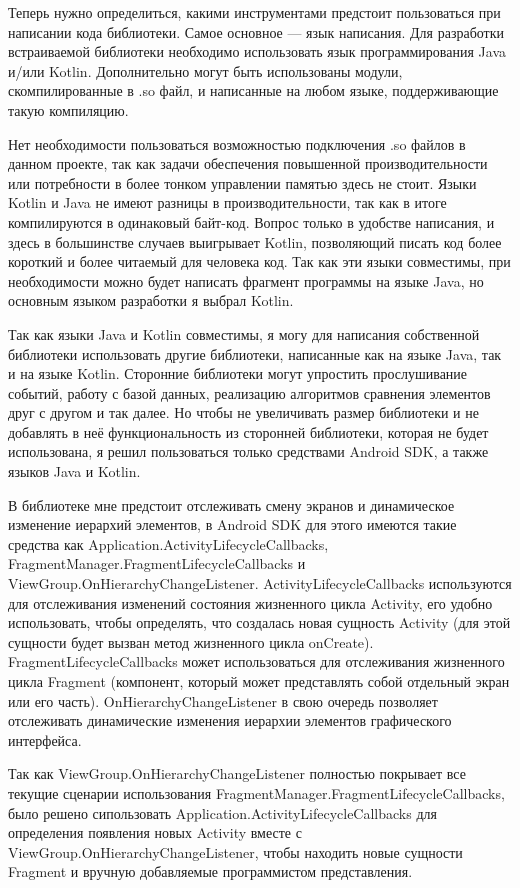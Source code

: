 \documentclass[a4paper,14pt]{extarticle} %
\begin{document}
	Теперь нужно определиться, какими инструментами предстоит пользоваться при написании кода библиотеки. Самое основное — язык написания. Для разработки встраиваемой библиотеки необходимо использовать язык программирования Java и/или Kotlin. Дополнительно могут быть использованы модули, скомпилированные в .so файл, и написанные на любом языке, поддерживающие такую компиляцию. 
	
	Нет необходимости пользоваться возможностью подключения .so файлов в данном проекте, так как задачи обеспечения повышенной производительности или потребности в более тонком управлении памятью здесь не стоит. Языки Kotlin и Java не имеют разницы в производительности, так как в итоге компилируются в одинаковый байт-код. Вопрос только в удобстве написания, и здесь в большинстве случаев выигрывает Kotlin, позволяющий писать код более короткий и более читаемый для человека код. Так как эти языки совместимы, при необходимости можно будет написать фрагмент программы на языке Java, но основным языком разработки я выбрал Kotlin.
	
	Так как языки Java и Kotlin совместимы, я могу для написания собственной библиотеки использовать другие библиотеки, написанные как на языке Java, так и на языке Kotlin. Сторонние библиотеки могут упростить прослушивание событий, работу с базой данных, реализацию алгоритмов сравнения элементов друг с другом и так далее. Но чтобы не увеличивать размер библиотеки и не добавлять в неё функциональность из сторонней библиотеки, которая не будет использована, я решил пользоваться только средствами Android SDK, а также языков Java и Kotlin.
	
	В библиотеке мне предстоит отслеживать смену экранов и динамическое изменение иерархий элементов, в Android SDK для этого имеются такие средства как Application.ActivityLifecycleCallbacks, FragmentManager.FragmentLifecycleCallbacks и ViewGroup.OnHierarchyChangeListener. ActivityLifecycleCallbacks используются для отслеживания изменений состояния жизненного цикла Activity, его удобно использовать, чтобы определять, что создалась новая сущность Activity (для этой сущности будет вызван метод жизненного цикла onCreate). FragmentLifecycleCallbacks может использоваться для отслеживания жизненного цикла Fragment (компонент, который может представлять собой отдельный экран или его часть). OnHierarchyChangeListener в свою очередь позволяет отслеживать динамические изменения иерархии элементов графического интерфейса.
	
	Так как ViewGroup.OnHierarchyChangeListener полностью покрывает все текущие сценарии использования FragmentManager.FragmentLifecycleCallbacks, было решено сипользовать Application.ActivityLifecycleCallbacks для определения появления новых Activity вместе с ViewGroup.OnHierarchyChangeListener, чтобы находить новые сущности Fragment и вручную добавляемые программистом представления.
\end{document}
